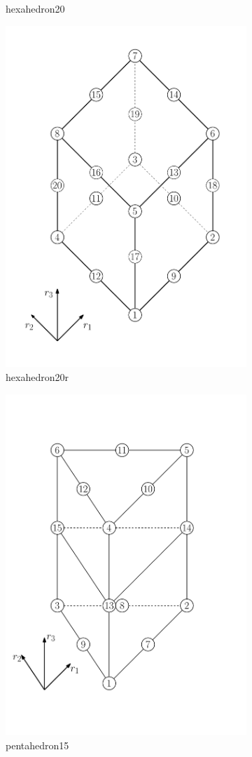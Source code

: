 \begin{figure}[htb]
\begin{subfigure}{0.5\textwidth}
    \caption{hexahedron20}
    \label{fig:EL:SOLID:HEXAHEDRON20}
  \end{subfigure}
  \begin{subfigure}{0.5\textwidth}
    \centering
    \includegraphics[width=.5\textwidth]{hexahedron20r}
    \caption{hexahedron20r}
    \label{fig:EL:SOLID:HEXAHEDRON20R}
  \end{subfigure}
  \begin{subfigure}{0.5\textwidth}
    \centering
    \includegraphics[width=.5\textwidth]{pentahedron15}
    \caption{pentahedron15}
    \label{fig:EL:SOLID:PENTAHEDRON15}
  \end{subfigure}
  \begin{subfigure}{0.5\textwidth}
    \centering

\end{subfigure}
\end{figure}
